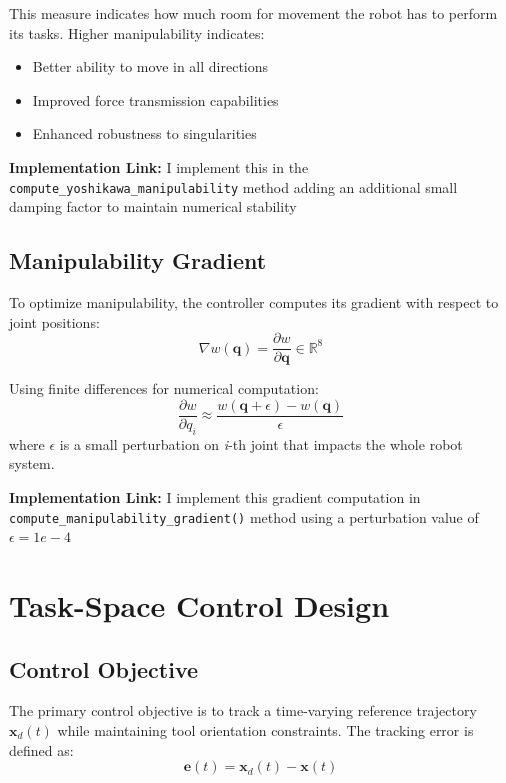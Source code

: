 \documentclass[journal,10pt,twocolumn]{IEEEtran}
\begin{document}
This measure indicates how much room for movement the robot has to perform its tasks. Higher manipulability indicates: 
\begin{itemize}
	\item Better ability to move in all directions
	\item Improved force transmission capabilities
	\item Enhanced robustness to singularities
\end{itemize}

\textbf{Implementation Link:} I implement this in the \texttt{compute\_yoshikawa\_manipulability} method adding an additional small damping factor to maintain numerical stability

\subsection{Manipulability Gradient}
To optimize manipulability, the controller computes its gradient with respect to joint positions:
\begin{equation}
\nabla w(\mathbf{q}) = \frac{\partial w}{\partial \mathbf{q}} \in \mathbb{R}^8
\end{equation}

Using finite differences for numerical computation:
\begin{equation}
\frac{\partial w}{\partial q_i} \approx \frac{w(\mathbf{q} + \epsilon) - w(\mathbf{q})}{\epsilon}
\end{equation}
where $\epsilon$ is a small perturbation on \textit{i}-th joint that impacts the whole robot system.

\textbf{Implementation Link:} I implement this gradient computation in \texttt{compute\_manipulability\_gradient()} method using a perturbation value of $\epsilon = 1e-4$

\section{Task-Space Control Design}

\subsection{Control Objective}
The primary control objective is to track a time-varying reference trajectory $\mathbf{x}_d(t)$ while maintaining tool orientation constraints. The tracking error is defined as:
\begin{equation}
\mathbf{e}(t) = \mathbf{x}_d(t) - \mathbf{x}(t)
\end{equation}
\end{document}
